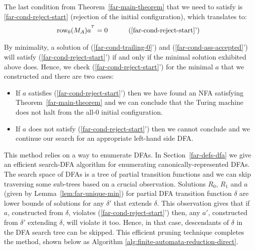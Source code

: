 The last condition from Theorem~\ref{far-main-theorem} that we need to satisfy is \eqref{far-cond-reject-start} (rejection of the initial configuration), which translates to:
\begin{align}
  \row_0 (M_A) a^{\T} & =0
                      & \tag{\ref{far-cond-reject-start}'}
\end{align}

By minimality, a solution of (\ref{far-cond-trailing-0}') and (\ref{far-cond-ass-accepted}') will satisfy (\ref{far-cond-reject-start}') if and only if the minimal solution exhibited above does. Hence, we check (\ref{far-cond-reject-start}') for the minimal $a$ that we constructed and there are two cases:

\begin{itemize}
  \item If $a$ satisfies (\ref{far-cond-reject-start}') then we have found an NFA satisfying Theorem~\ref{far-main-theorem} and we can conclude that the Turing machine does not halt from the all-0 initial configuration.
  \item If $a$ does not satisfy (\ref{far-cond-reject-start}') then we cannot conclude and we continue our search for an appropriate left-hand side DFA.
\end{itemize}

This method relies on a way to enumerate DFAs. In Section~\ref{far-defs-dfa} we give an efficient {\sc search-DFA} algorithm for enumerating canonically-represented DFAs. The search space of DFAs is a tree of partial transition functions and we can skip traversing some sub-trees based on a crucial observation. Solutions $R_0$, $R_1$ and $a$ (given by Lemma~\ref{lem:far-unique-min}) for partial DFA transition function $\delta$ are lower bounds of solutions for any $\delta'$ that extends $\delta$. This observation gives that if $a$, constructed from $\delta$, violates (\ref{far-cond-reject-start}') then, any $a'$, constructed from $\delta'$ extending $\delta$, will violate it too. Hence, in that case, descendants of $\delta$ in the DFA search tree can be skipped.
This efficient pruning technique completes the method, shown below as Algorithm \ref{alg:finite-automata-reduction-direct}.

